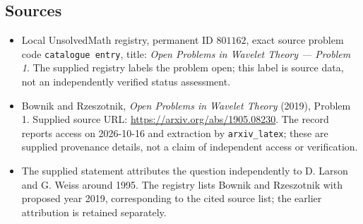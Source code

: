 \documentclass[11pt]{article}
\begin{document}
\subsection{Sources}
\begin{itemize}
\item Local UnsolvedMath registry, permanent ID \(801162\), exact source problem code \texttt{catalogue entry}, title: \emph{Open Problems in Wavelet Theory --- Problem 1}. The supplied registry labels the problem open; this label is source data, not an independently verified status assessment.
\item Bownik and Rzeszotnik, \emph{Open Problems in Wavelet Theory} (2019), Problem 1. Supplied source URL: \url{https://arxiv.org/abs/1905.08230}. The record reports access on 2026-10-16 and extraction by \texttt{arxiv\_latex}; these are supplied provenance details, not a claim of independent access or verification.
\item The supplied statement attributes the question independently to D. Larson and G. Weiss around 1995. The registry lists Bownik and Rzeszotnik with proposed year 2019, corresponding to the cited source list; the earlier attribution is retained separately.
\end{itemize}
\end{document}
